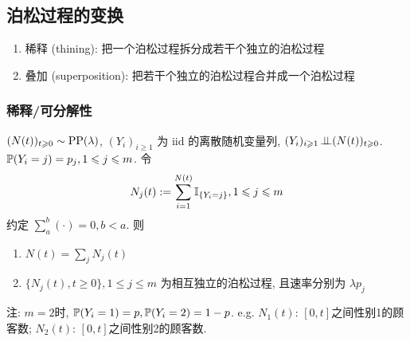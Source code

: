 \subsection{泊松过程的变换}
\begin{enumerate}
    \item 稀释 (thining): 把一个泊松过程拆分成若干个独立的泊松过程
    \item 叠加 (superposition): 把若干个独立的泊松过程合并成一个泊松过程
\end{enumerate}

\subsubsection{稀释/可分解性}

\begin{theorem}
    $(N(t))_{t\geqslant 0}\sim \operatorname{PP}(\lambda)$, $(Y_i)_{i\geq 1}$ 为 iid 的离散随机变量列, $(Y_i)_{i\geqslant 1}\operatorname{\perp\!\!\!\perp} (N(t))_{t\geqslant 0}$. $\mathbb{P}(Y_i=j)=p_j,1\leqslant j\leqslant m$. 令
    \[
    N_j(t):=\sum_{i=1}^{N(t)}\mathbb I_{\{Y_i=j\}}, 1\leqslant j\leqslant m
    \]
    约定 $\sum_a^b(\cdot)=0, b<a$. 则
    \begin{enumerate}
        \item $N(t)=\sum_j N_j(t)$
        \item $\{N_j(t),t\geq 0\},1\leq j\leq m$ 为相互独立的泊松过程, 且速率分别为 $\lambda p_j$
    \end{enumerate}
\end{theorem}
注: $m=2$时, $\mathbb{P}(Y_i=1)=p,\mathbb{P}(Y_i=2)=1-p$. e.g. $N_1(t)$: $[0,t]$之间性别1的顾客数; $N_2(t)$: $[0,t]$之间性别2的顾客数.

